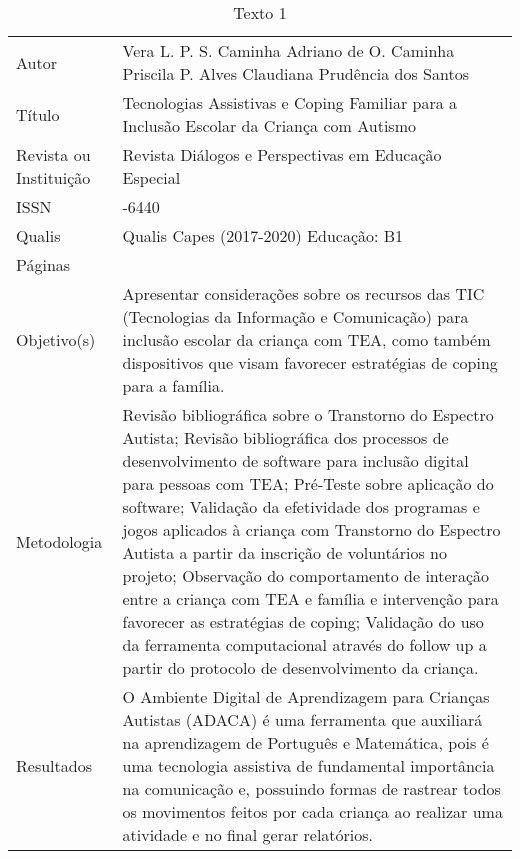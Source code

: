 \documentclass[portuguese]{textolivre}
\begin{document}
\begin{footnotesize}
\begin{longtable}{
    >{\raggedright\arraybackslash}p{}
    >{\raggedright\arraybackslash}p{}
    }
\caption{Texto 1}
\label{tbl03}
\\
\toprule
Autor & Vera L. P. S. Caminha\newline
Adriano de O. Caminha\newline
Priscila P. Alves\newline
Claudiana Prudência dos Santos\\
Título & Tecnologias Assistivas e Coping Familiar para a Inclusão Escolar da Criança com Autismo\\
Revista ou Instituição & Revista Diálogos e Perspectivas em Educação Especial\\
ISSN & 2764-6440 \\
Qualis & Qualis Capes (2017-2020) Educação: B1 \\
Páginas & 14 \\
Objetivo(s) & Apresentar considerações sobre os recursos das TIC (Tecnologias da
Informação e Comunicação) para inclusão escolar da criança com TEA,
como também dispositivos que visam favorecer estratégias de coping para a
família.\\
Metodologia & Revisão bibliográfica sobre o Transtorno do Espectro Autista;\newline
Revisão bibliográfica dos processos de desenvolvimento de software para inclusão digital para pessoas com TEA;\newline
Pré-Teste sobre aplicação do software;\newline
Validação da efetividade dos programas e jogos aplicados à criança com Transtorno do Espectro Autista a partir da inscrição de voluntários no projeto;\newline
Observação do comportamento de interação entre a criança com TEA e família e intervenção para favorecer as estratégias de coping;\newline
Validação do uso da ferramenta computacional através do follow up a partir do protocolo de desenvolvimento da criança.\\
Resultados & O Ambiente Digital de Aprendizagem para Crianças Autistas (ADACA) é
uma ferramenta que auxiliará na aprendizagem de Português e Matemática,
pois é uma tecnologia assistiva de fundamental importância na comunicação
e, possuindo formas de rastrear todos os movimentos feitos por cada criança
ao realizar uma atividade e no final gerar relatórios. \\

\end{longtable}
\end{footnotesize}
\end{document}
